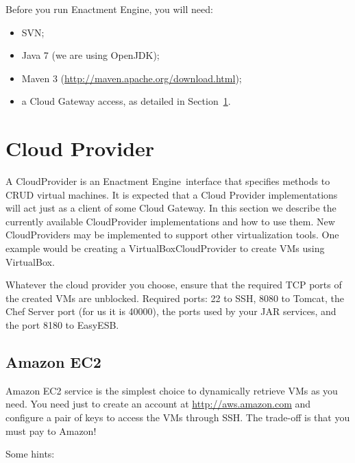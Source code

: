 \documentclass[a4paper, 10pt]{article}
\newcommand{\ee}{Enactment Engine}
\begin{document}
Before you run \ee, you will need:

\begin{itemize}
\item SVN;
\item Java 7 (we are using OpenJDK);
\item Maven 3  (\url{http://maven.apache.org/download.html});
\item a Cloud Gateway access, as detailed in Section~\ref{sec:cloud}.
\end{itemize}

\section{Cloud Provider}
\label{sec:cloud}

A \textsf{CloudProvider} is an \ee\ interface that specifies methods to CRUD virtual machines. It is expected that a \textsf{Cloud Provider} implementations will act just as a client of some Cloud Gateway. In this section we describe the currently available \textsf{CloudProvider} implementations and how to use them. New \textsf{CloudProvider}s may be implemented to support other virtualization tools. One example would be creating a \textsf{VirtualBoxCloudProvider} to create VMs using VirtualBox.

Whatever the cloud provider you choose, ensure that the required TCP ports of the created VMs are unblocked. Required ports: 22 to SSH, 8080 to Tomcat, the Chef Server port (for us it is 40000), the ports used by your JAR services, and the port 8180 to EasyESB.

\subsection{Amazon EC2}

Amazon EC2 service is the simplest choice to dynamically retrieve VMs as you need. You need just to create an account at \url{http://aws.amazon.com} and configure a pair of keys to access the VMs through SSH. The trade-off is that you must pay to Amazon! 

Some hints:
\end{document}

